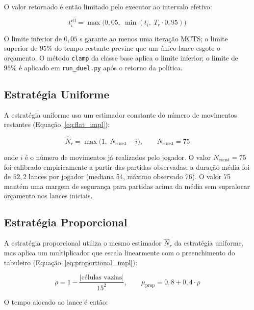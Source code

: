 \documentclass[cic,tc]{iiufrgs}
\begin{document}
O valor retornado é então limitado pelo executor ao intervalo efetivo:

\begin{equation}
    t_i^{\text{eff}} = \max\!\bigl(0{,}05,\; \min(t_i,\; T_r \cdot 0{,}95)\bigr)
\label{eq:clamp}
\end{equation}

O limite inferior de $0{,}05$ s garante ao menos uma iteração MCTS; o limite superior de $95\%$ do tempo restante previne que um único lance esgote o orçamento. O método \texttt{clamp} da classe base aplica o limite inferior; o limite de $95\%$ é aplicado em \texttt{run\_duel.py} após o retorno da política.

\subsection{Estratégia Uniforme}
\label{sec:impl_flat}

A estratégia uniforme usa um estimador constante do número de movimentos restantes (Equação~\ref{eq:flat_impl}):

\begin{equation}
    \hat{N}_r = \max\!\bigl(1,\; N_{\text{const}} - i\bigr), \qquad N_{\text{const}} = 75
\label{eq:flat_impl}
\end{equation}

onde $i$ é o número de movimentos já realizados pelo jogador. O valor $N_{\text{const}} = 75$ foi calibrado empiricamente a partir das partidas observadas: a duração média foi de $52{,}2$ lances por jogador (mediana 54, máximo observado 76). O valor 75 mantém uma margem de segurança para partidas acima da média sem supralocar orçamento nos lances iniciais.

\subsection{Estratégia Proporcional}
\label{sec:impl_proportional}

A estratégia proporcional utiliza o mesmo estimador $\hat{N}_r$ da estratégia uniforme, mas aplica um multiplicador que escala linearmente com o preenchimento do tabuleiro (Equação~\ref{eq:proportional_impl}):

\begin{equation}
    \rho = 1 - \frac{|\text{células vazias}|}{15^2}, \qquad
    \mu_{\text{prop}} = 0{,}8 + 0{,}4 \cdot \rho
\label{eq:proportional_impl}
\end{equation}

O tempo alocado ao lance é então:
\end{document}
